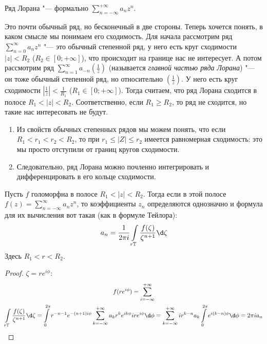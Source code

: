 \begin{Def}
	Ряд Лорана "--- формально $\sum_{n=-\infty}^{+\infty} a_n z^n$.
\end{Def}
Это почти обычный ряд, но бесконечный в две стороны.
Теперь хочется понять, в каком смысле мы понимаем его сходимость.
Для начала рассмотрим ряд $\sum_{n=0}^\infty a_nz^n$ "--- это обычный степенной ряд,
у него есть круг сходимости $|z| < R_2$ ($R_2 \in [0; +\infty]$), что происходит на границе нас не интересует.
А потом рассмотрим ряд $\sum_{n=1}^\infty a_{-n}\left(\frac1z\right)$ (называется \textit{главной частью ряда Лорана}) "---
он тоже обычный степенной ряд, но относительно $\left(\frac1z\right)$.
У него есть круг сходимости $\left|\frac1z\right| < \frac1{R_1}$ ($R_1 \in [0; +\infty]$).
Тогда считаем, что ряд Лорана сходится в полосе $R_1 < |z| < R_2$.
Соответственно, если $R_1 \ge R_2$, то ряд не сходится, но такие нас интересовать не будут.

\begin{enumerate}
\item
	Из свойств обычных степенных рядов мы можем понять, что если $R_1 < r_1 < r_2 < R_2$,
	то при $r_1 \le |Z| \le r_2$ имеется равномерная сходимость: это мы просто отступили от границ
	кругов сходимости.
\item
	Следовательно, ряд Лорана можно почленно интегрировать и дифференцировать в его кольце сходимости.
\end{enumerate}

\begin{theorem}
	Пусть $f$ голоморфна в полосе $R_1<|z|<R_2$.
	Тогда если в этой полосе $f(z)=\sum_{n=-\infty}^\infty a_nz^n$, то коэффициенты $z_n$ определяются однозначно
	и формула для их вычисления вот такая (как в формуле Тейлора):
	\[ a_n = \frac1{2\pi i} \int\limits_{r\mathbb T} \frac{f(\zeta)}{\zeta^{n+1}} \d \zeta \]
	Здесь $R_1 < r < R_2$.
\end{theorem}
\begin{proof}
	$\zeta = re^{i\phi}$:
	\begin{gather*}
		f(re^{i\phi}) = \sum_{i=-\infty}^{+\infty} \\
		\int\limits_{r\mathbb T} \frac{f(\zeta)}{\zeta^{n+1}} \d \zeta
		= \int\limits_0^{2\pi} r^{-n-1}e^{-(n+1)i\phi} \sum_{k=-\infty}^{+\infty} a_k r^k e^{ik\phi}ire^{i\phi} \d \phi
		= \sum_{k=-\infty}^{+\infty} ir^{k-n} a_k \int\limits_0^{2\pi} e^{i(k-n)\phi} \d \phi = 2\pi ia_n
	\end{gather*}
\end{proof}


